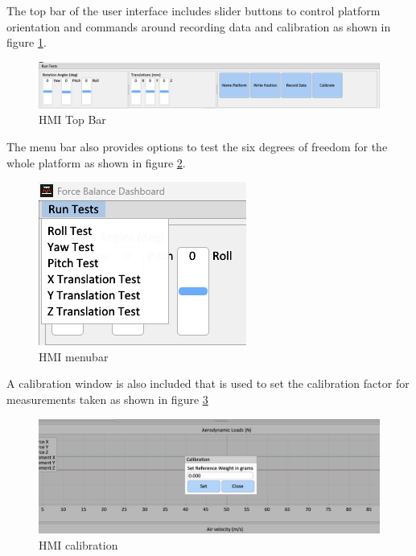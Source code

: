 The top bar of the user interface includes slider buttons to control platform orientation and commands around recording data and calibration as shown in figure \ref{fig:hmi_top}.
\begin{center}
	\begin{figure}[H]
		\centering
		\includegraphics[width=1\linewidth]{Figures/Screenshot 2022-12-11 195125.png}
		\caption[HMI Top Bar]{HMI Top Bar}
		\label{fig:hmi_top}
	\end{figure}
\end{center}

The menu bar also provides options to test the six degrees of freedom for the whole platform as shown in figure \ref{fig:hmi_menu}.
\begin{center}
	\begin{figure}[H]
		\centering
		\includegraphics{Figures/Screenshot 2022-12-11 195108.png}
		\caption[HMI menubar]{HMI menubar}
		\label{fig:hmi_menu}
	\end{figure}
\end{center}
A calibration window is also included that is used to set the calibration factor for measurements taken as shown in figure \ref{fig:hmi_calib}
\begin{center}
	\begin{figure}[H]
		\centering
		\includegraphics[width=1\linewidth]{Figures/Screenshot 2022-12-11 195034.png}
		\caption[HMI calibration]{HMI calibration}
		\label{fig:hmi_calib}
	\end{figure}
\end{center}
